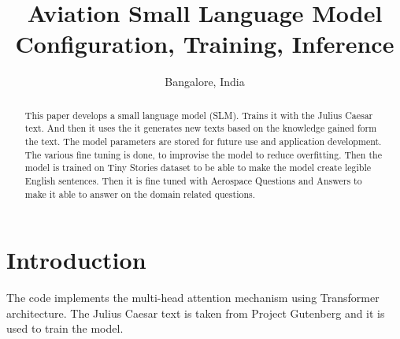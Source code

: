 \documentclass[conference]{IEEEtran}
\begin{document}
\title{Aviation Small Language Model \\ Configuration, Training, Inference}

\author{
Bangalore, India}

\maketitle

\begin{abstract}
This paper develops a small language model (SLM). Trains it with the Julius Caesar text. And then it uses the it generates new texts based on the knowledge gained form the text. The model parameters are stored for future use and application development. The various fine tuning is done, to improvise the model to reduce overfitting. 
Then the model is trained on Tiny Stories dataset to be able to make the model create legible English sentences. Then it is fine tuned with Aerospace Questions and Answers to make it able to answer on the domain related questions.
\end{abstract}

\section{Introduction}
The code implements the multi-head attention mechanism using Transformer architecture. The Julius Caesar text is taken from Project Gutenberg and it is used to train the model. 
\end{document}
